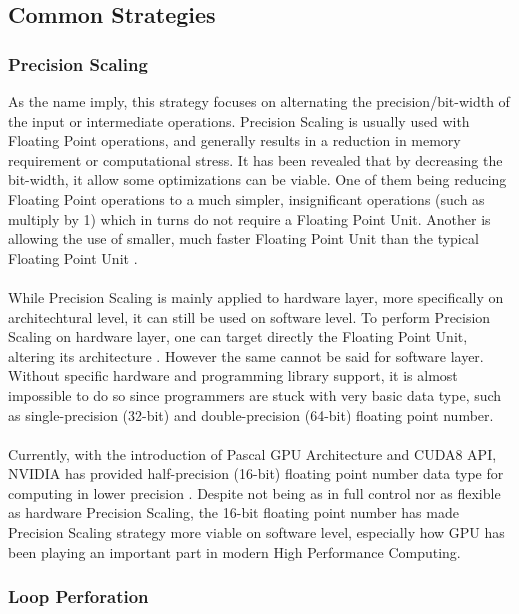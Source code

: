 \subsection{Common Strategies}

\subsubsection{Precision Scaling}

As the name imply, this strategy focuses on alternating the precision/bit-width of the input or intermediate operations. Precision Scaling is usually used with Floating Point operations, and generally results in a reduction in memory requirement or computational stress. It has been revealed that by decreasing the bit-width, it allow some optimizations can be viable. One of them being reducing Floating Point operations to a much simpler, insignificant operations (such as multiply by 1) which in turns do not require a Floating Point Unit. Another is allowing the use of smaller, much faster Floating Point Unit than the typical Floating Point Unit \cite{4408271}. \\
~\\
While Precision Scaling is mainly applied to hardware layer, more specifically on architechtural level, it can still be used on software level. To perform Precision Scaling on hardware layer, one can target directly the Floating Point Unit, altering its architecture \cite{AxCSurvey}. However the same cannot be said for software layer. Without specific hardware and programming library support, it is almost impossible to do so since programmers are stuck with very basic data type, such as single-precision (32-bit) and double-precision (64-bit) floating point number. \\
~\\
Currently, with the introduction of Pascal GPU Architecture and CUDA8 API, NVIDIA has provided half-precision (16-bit) floating point number data type for computing in lower precision \cite{CUDA8}. Despite not being as in full control nor as flexible as hardware Precision Scaling, the 16-bit floating point number has made Precision Scaling strategy more viable on software level, especially how GPU has been playing an important part in modern High Performance Computing. \\

\subsubsection{Loop Perforation}

